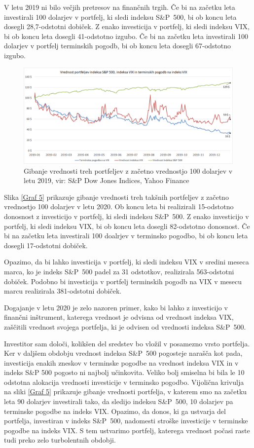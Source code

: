 \documentclass[12pt,a4paper, reqno]{amsart}
\theoremstyle{definition} %
\theoremstyle{plain} %
\begin{document}
V letu 2019 ni bilo večjih pretresov na finančnih trgih. Če bi na začetku leta investirali 100 dolarjev v portfelj, ki sledi indeksu S\&P~500, bi ob koncu leta dosegli 28,7-odstotni dobiček. Z enako investicija v portfelj, ki sledi indeksu VIX, bi ob koncu leta dosegli 41-odstotno izgubo. Če bi na začetku leta investirali 100 dolarjev v portfelj terminskih pogodb, bi ob koncu leta dosegli 67-odstotno izgubo.
\begin{figure}[!h]
\centering
\includegraphics[width = 15 cm]{Grafi/Portfolio_VIX_futures_2019.png}
\caption{Gibanje vrednosti treh portfeljev z začetno vrednostjo 100 dolarjev v letu 2019, vir: S\&P Dow Jones Indices, Yahoo Finance}
\label{Graf 4}
\end{figure}

Slika \ref{Graf 5} prikazuje gibanje vrednosti treh takšnih portfeljev z začetno vrednostjo 100 dolarjev v letu 2020. Ob koncu leta bi realizirali 15-odstotno donosnost z investicijo v portfelj, ki sledi indeksu S\&P~500.  Z enako investicijo v portfelj, ki sledi indeksu VIX, bi ob koncu leta dosegli 82-odstotno donosnost. Če bi na začetku leta investirali 100 doalrjev v terminsko pogodbo, bi ob koncu leta dosegli 17-odstotni dobiček.\

Opazimo, da bi lahko investicija v portfelj, ki sledi indeksu VIX v sredini meseca marca, ko je indeks S\&P~500 padel za 31 odstotkov, realizirala 563-odstotni dobiček. Podobno bi investicija v portfelj terminskih pogodb na VIX v mesecu marcu realizirala 381-odstotni dobiček.\

Dogajanje v letu 2020 je zelo nazoren primer, kako bi lahko z investicijo v finančni inštrument, katerega vrednost je odvisna od vrednost indeksa VIX, zaščitili vrednost svojega portfelja, ki je odvisen od vrednosti indeksa S\&P~500.\

Investitor sam določi, kolikšen del sredstev bo vložil v posamezno vrsto portfelja. Ker v daljšem obdobju vrednost indeksa S\&P~500 pogosteje narašča kot pada, investicija enakih zneskov v terminske pogodbe na vrednost indeksa VIX in v indeks S\&P 500 pogosto ni najbolj učinkovita. Veliko bolj smiselna bi bila le 10 odstotna alokacija vrednosti investicije v terminsko pogodbo. Vijolična krivulja na sliki \ref{Graf 5} prikazuje gibanje vrednosti portfelja, v katerem smo na začetku leta 90 dolarjev investirali tako, da sledijo indeksu S\&P~500, 10 dolarjev pa terminske pogodbe na indeks VIX. Opazimo, da donos, ki ga ustvarja del portfelja, investiran v indeks S\&P~500, nadomesti stroške investicije v terminske pogodbe na indeks VIX. S tem ustvarimo portfelj, katerega vrednost počasi raste tudi preko zelo turbolentnih obdobji.
\end{document}
